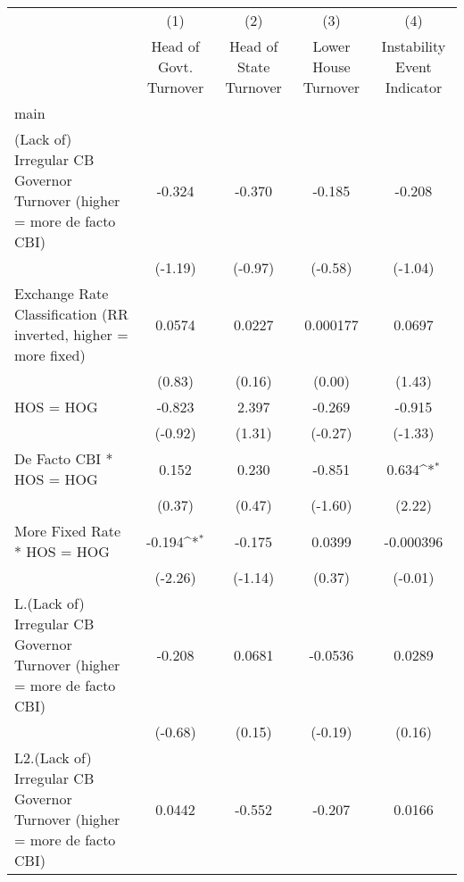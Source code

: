 {
\def\sym#1{\ifmmode^{#1}\else\(^{#1}\)\fi}
\begin{tabular}{l*{4}{c}}
\hline\hline
                &\multicolumn{1}{c}{(1)}&\multicolumn{1}{c}{(2)}&\multicolumn{1}{c}{(3)}&\multicolumn{1}{c}{(4)}\\
                &\multicolumn{1}{c}{Head of Govt. Turnover}&\multicolumn{1}{c}{Head of State Turnover}&\multicolumn{1}{c}{Lower House Turnover}&\multicolumn{1}{c}{Instability Event Indicator}\\
\hline
main            &                  &                  &                  &                  \\
(Lack of) Irregular CB Governor Turnover (higher = more de facto CBI)&   -0.324         &   -0.370         &   -0.185         &   -0.208         \\
                &  (-1.19)         &  (-0.97)         &  (-0.58)         &  (-1.04)         \\
[1em]
Exchange Rate Classification (RR inverted, higher = more fixed)&   0.0574         &   0.0227         & 0.000177         &   0.0697         \\
                &   (0.83)         &   (0.16)         &   (0.00)         &   (1.43)         \\
[1em]
HOS = HOG       &   -0.823         &    2.397         &   -0.269         &   -0.915         \\
                &  (-0.92)         &   (1.31)         &  (-0.27)         &  (-1.33)         \\
[1em]
De Facto CBI * HOS = HOG&    0.152         &    0.230         &   -0.851         &    0.634\sym{*}  \\
                &   (0.37)         &   (0.47)         &  (-1.60)         &   (2.22)         \\
[1em]
More Fixed Rate * HOS = HOG&   -0.194\sym{*}  &   -0.175         &   0.0399         &-0.000396         \\
                &  (-2.26)         &  (-1.14)         &   (0.37)         &  (-0.01)         \\
[1em]
L.(Lack of) Irregular CB Governor Turnover (higher = more de facto CBI)&   -0.208         &   0.0681         &  -0.0536         &   0.0289         \\
                &  (-0.68)         &   (0.15)         &  (-0.19)         &   (0.16)         \\
[1em]
L2.(Lack of) Irregular CB Governor Turnover (higher = more de facto CBI)&   0.0442         &   -0.552         &   -0.207         &   0.0166         \\

\end{tabular}}
